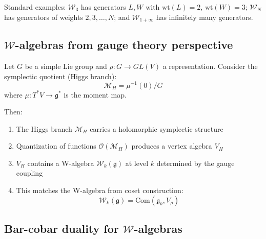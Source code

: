 Standard examples: $\mathcal{W}_3$ has generators $L, W$ with $\text{wt}(L) = 2$, $\text{wt}(W) = 3$; $\mathcal{W}_N$ has generators of weights $2, 3, \ldots, N$; and $\mathcal{W}_{1+\infty}$ has infinitely many generators.

\subsection{$\mathcal{W}$-algebras from gauge theory perspective}

\begin{theorem}\label{thm:w-from-gauge}
\cite{ACL19} Let $G$ be a simple Lie group and $\rho: G \to GL(V)$ a 
representation. Consider the symplectic quotient (Higgs branch):
\[\mathcal{M}_H = \mu^{-1}(0) / G\]
where $\mu: T^*V \to \mathfrak{g}^*$ is the moment map.

Then:
\begin{enumerate}
\item The Higgs branch $\mathcal{M}_H$ carries a holomorphic symplectic structure

\item Quantization of functions $\mathcal{O}(\mathcal{M}_H)$ produces a vertex 
      algebra $V_H$
      
\item $V_H$ contains a W-algebra $\mathcal{W}_k(\mathfrak{g})$ at level $k$ 
      determined by the gauge coupling
      
\item This matches the W-algebra from coset construction: 
      \[\mathcal{W}_k(\mathfrak{g}) = \text{Com}(\mathfrak{g}_k, V_\rho)\]
\end{enumerate}
\end{theorem}


\subsection{Bar-cobar duality for $\mathcal{W}$-algebras}

